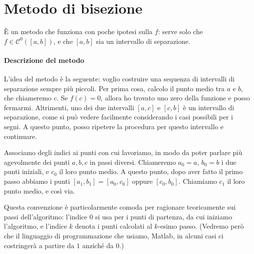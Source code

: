 \documentclass[a4paper]{report}
\theoremstyle{definiton}
\theoremstyle{remark}
\begin{document}
\section{Metodo di bisezione}

È un metodo che funziona con poche ipotesi sulla $f$: serve solo che $f \in \mathcal{C}^0([a,b])$, e che $[a,b]$ sia un intervallo di separazione.

\paragraph{Descrizione del metodo} L'idea del metodo è la seguente: voglio costruire una sequenza di intervalli di separazione sempre più piccoli. Per prima cosa, calcolo il punto medio tra $a$ e $b$, che chiameremo $c$. Se $f(c) = 0$, allora ho trovato uno zero della funzione e posso fermarmi. Altrimenti, uno dei due intervalli $[a,c]$ e $[c,b]$ è un intervallo di separazione, come si può vedere facilmente considerando i casi possibili per i segni. A questo punto, posso ripetere la procedura per questo intervallo e continuare.

\begin{center}
\end{center}

Associamo degli indici ai punti con cui lavoriamo, in modo da poter parlare più agevolmente dei punti $a,b,c$ in passi diversi. Chiameremo $a_0 = a$, $b_0=b$ i due punti iniziali, e $c_0$ il loro punto medio. A questo punto, dopo aver fatto il primo passo abbiamo i punti $[a_1,b_1] = [a_0,c_0]$ oppure $[c_0,b_0]$. Chiamiamo $c_1$ il loro punto medio, e così via.

Questa convenzione è particolarmente comoda per ragionare teoricamente sui passi dell'algoritmo: l'indice $0$ si usa per i punti di partenza, da cui iniziamo l'algoritmo, e l'indice $k$ denota i punti calcolati al $k$-esimo passo. (Vedremo però che il linguaggio di programmazione che usiamo, Matlab, in alcuni casi ci costringerà a partire da $1$ anziché da $0$.)
\end{document}
